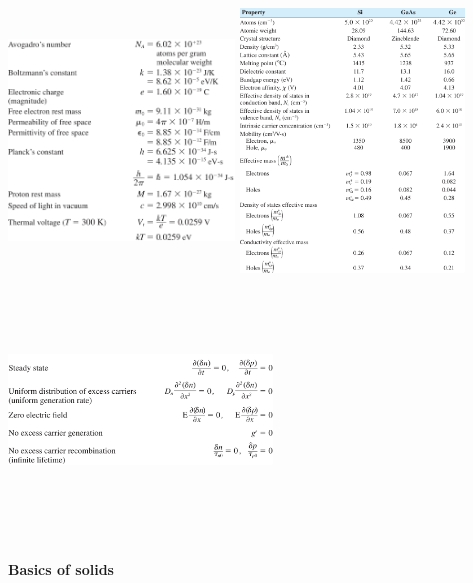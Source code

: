\documentclass{article}
\begin{document}
\begin{center}
    \includegraphics[align=c, height=7cm, width=6cm]{consts.png}
    \includegraphics[align=c, height=7cm, width=6cm]{props.png}
    \includegraphics[align=c, height=7cm, width=7cm]{continuity.png}
\end{center}
\textbf{Basics of solids}
\end{document}
